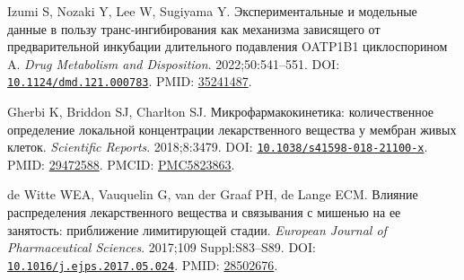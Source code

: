\documentclass[11pt]{article}
\begin{document}
\begin{description}[before={\microtypesetup{expansion=false}\setlength{\RaggedRightRightskip}{0pt plus 4em}\RaggedRight}]
\item[{[103]}] Izumi S, Nozaki Y, Lee W, Sugiyama Y. Экспериментальные и модельные данные в пользу транс-ингибирования как механизма зависящего от предварительной инкубации длительного подавления OATP1B1 циклоспорином A. \textit{\foreignlanguage{english}{Drug Metabolism and Disposition}}. 2022;50:541--551. DOI: \href{https://doi.org/10.1124/dmd.121.000783}{\nolinkurl{10.1124/dmd.121.000783}}. PMID: \href{https://pubmed.ncbi.nlm.nih.gov/35241487/}{35241487}.
\item[{[104]}] Gherbi K, Briddon SJ, Charlton SJ. Микрофармакокинетика: количественное определение локальной концентрации лекарственного вещества у мембран живых клеток. \textit{\foreignlanguage{english}{Scientific Reports}}. 2018;8:3479. DOI: \href{https://doi.org/10.1038/s41598-018-21100-x}{\nolinkurl{10.1038/s41598-018-21100-x}}. PMID: \href{https://pubmed.ncbi.nlm.nih.gov/29472588/}{29472588}. PMCID: \href{https://pmc.ncbi.nlm.nih.gov/articles/PMC5823863/}{PMC5823863}.
\item[{[105]}] de Witte WEA, Vauquelin G, van der Graaf PH, de Lange ECM. Влияние распределения лекарственного вещества и связывания с мишенью на ее занятость: приближение лимитирующей стадии. \textit{\foreignlanguage{english}{European Journal of Pharmaceutical Sciences}}. 2017;109 Suppl:S83--S89. DOI: \href{https://doi.org/10.1016/j.ejps.2017.05.024}{\nolinkurl{10.1016/j.ejps.2017.05.024}}. PMID: \href{https://pubmed.ncbi.nlm.nih.gov/28502676/}{28502676}.

\end{description}
\end{document}
